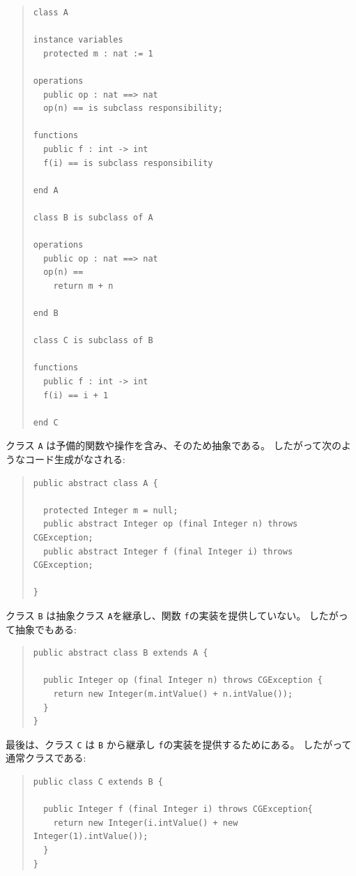 \documentclass[\pformat,11pt]{jarticle}
\begin{document}
\begin{quote}
\begin{verbatim}
class A

instance variables
  protected m : nat := 1

operations
  public op : nat ==> nat
  op(n) == is subclass responsibility;

functions
  public f : int -> int
  f(i) == is subclass responsibility

end A

class B is subclass of A

operations
  public op : nat ==> nat
  op(n) ==
    return m + n

end B

class C is subclass of B

functions
  public f : int -> int
  f(i) == i + 1

end C
\end{verbatim}
\end{quote}
クラス \texttt{A} は予備的関数や操作を含み、そのため抽象である。
したがって次のようなコード生成がなされる:
\begin{quote}
\begin{verbatim}
public abstract class A {

  protected Integer m = null;
  public abstract Integer op (final Integer n) throws CGException;
  public abstract Integer f (final Integer i) throws CGException;

}
\end{verbatim}
\end{quote}
クラス \texttt{B} は抽象クラス \texttt{A}を継承し、関数 \texttt{f}の実装を提供していない。
したがって抽象でもある:

\begin{quote}
\begin{verbatim}
public abstract class B extends A {

  public Integer op (final Integer n) throws CGException {
    return new Integer(m.intValue() + n.intValue());
  }
}
\end{verbatim}
\end{quote}

最後は、クラス \texttt{C} は \texttt{B} から継承し \texttt{f}の実装を提供するためにある。
したがって通常クラスである:
\begin{quote}
\begin{verbatim}
public class C extends B {

  public Integer f (final Integer i) throws CGException{
    return new Integer(i.intValue() + new Integer(1).intValue());
  }
}
\end{verbatim}
\end{quote}
\end{document}
